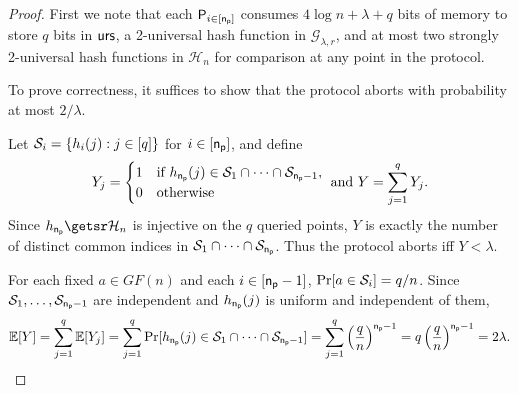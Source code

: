 


\begin{proof}
First we note that each $\mathsf{P}_{i\in[\mathsf{n_p}]}$ consumes $4\log n+\lambda+q$ bits of memory to store $q$ bits in $\mathsf{urs}$, a 2-universal hash function in $\mathcal G_{\lambda,r}$, and at most two strongly 2-universal hash functions in $\mathcal H_n$ for comparison at any point in the protocol.

To prove correctness, it suffices to show that the protocol aborts with probability at most $2/\lambda$.

Let $\mathcal{S}_i=\{h_i(j):j\in[q]\}$ for $i\in[\mathsf{n_p}]$, and define
\[
Y_j=
\begin{cases}
1 & \mbox{if } h_{\mathsf{n_p}}(j)\in \mathcal{S}_1\cap\cdots\cap\mathcal{S}_{\mathsf{n_p}-1},\\
0 & \mbox{otherwise}
\end{cases}
\ \mbox{and}\
Y=\sum_{j=1}^qY_j .
\]
Since $h_\pnum\getsr\mathcal H_n$ is injective on the $q$ queried points, $Y$ is exactly the number of distinct common indices in $\mathcal{S}_1\cap\cdots\cap\mathcal{S}_{\mathsf{n_p}}$. Thus the protocol aborts iff $Y<\lambda$.

For each fixed $a\in GF(n)$ and each $i\in[\mathsf{n_p}-1]$, $\Pr[a\in\mathcal{S}_i]=q/n$. Since $\mathcal{S}_1,\ldots,\mathcal{S}_{\mathsf{n_p}-1}$ are independent and $h_{\mathsf{n_p}}(j)$ is uniform and independent of them,
\[
\mathbb E[Y]
=\sum_{j=1}^q\mathbb E[Y_j]=
\sum_{j=1}^q \Pr[h_{\mathsf{n_p}}(j)\in \mathcal{S}_1\cap\cdots\cap\mathcal{S}_{\mathsf{n_p}-1}]
=
\sum_{j=1}^q \left(\frac qn\right)^{\mathsf{n_p}-1}
=
q\left(\frac qn\right)^{\mathsf{n_p}-1}
=
2\lambda .
\]


\end{proof}

